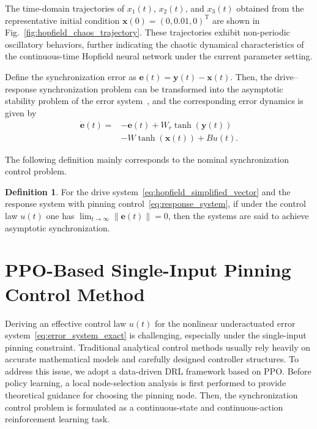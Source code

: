 \documentclass[10pt,twocolumn]{article}
\theoremstyle{definition}
\newtheorem{definition}{Definition}
\begin{document}
The time-domain trajectories of $x_1(t)$, $x_2(t)$, and $x_3(t)$ obtained from the representative initial condition $\mathbf{x}(0)=(0,0.01,0)^{\mathrm T}$ are shown in Fig.~\ref{fig:hopfield_chaos_trajectory}. These trajectories exhibit non-periodic oscillatory behaviors, further indicating the chaotic dynamical characteristics of the continuous-time Hopfield neural network under the current parameter setting.

Define the synchronization error as $\mathbf{e}(t) = \mathbf{y}(t) - \mathbf{x}(t)$. Then, the drive--response synchronization problem can be transformed into the asymptotic stability problem of the error system~\cite{boccaletti2002synchronization}, and the corresponding error dynamics is given by
\begin{equation}
\begin{aligned}
\dot{\mathbf{e}}(t)
={}&-\mathbf{e}(t)+W_r\tanh(\mathbf{y}(t))\\
&-W\tanh(\mathbf{x}(t))+Bu(t).
\end{aligned}
\label{eq:error_system_exact}
\end{equation}

The following definition mainly corresponds to the nominal synchronization control problem.
\begin{definition}
	For the drive system~\eqref{eq:hopfield_simplified_vector} and the response system with pinning control~\eqref{eq:response_system}, if under the control law $u(t)$ one has $\lim_{t \to \infty} \| \mathbf{e}(t) \| = 0$, then the systems are said to achieve asymptotic synchronization.
\end{definition}

\section{PPO-Based Single-Input Pinning Control Method}
\label{sec:ppo_pinning_method}

Deriving an effective control law $u(t)$ for the nonlinear underactuated error system~\eqref{eq:error_system_exact} is challenging, especially under the single-input pinning constraint. Traditional analytical control methods usually rely heavily on accurate mathematical models and carefully designed controller structures. To address this issue, we adopt a data-driven DRL framework based on PPO. Before policy learning, a local node-selection analysis is first performed to provide theoretical guidance for choosing the pinning node. Then, the synchronization control problem is formulated as a continuous-state and continuous-action reinforcement learning task.
\end{document}
